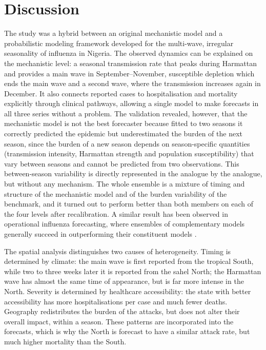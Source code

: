 \documentclass[12pt,a4paper]{article}
\theoremstyle{definition}
\theoremstyle{remark}
\begin{document}
\section{Discussion}\label{sec:discussion}

The study was a hybrid between an original mechanistic model and a probabilistic modeling framework developed for the multi-wave, irregular seasonality of influenza in Nigeria. The observed dynamics can be explained on the mechanistic level: a seasonal transmission rate that peaks during Harmattan and provides a main wave in September–November, susceptible depletion which ends the main wave and a second wave, where the transmission increases again in December. It also connects reported cases to hospitalisation and mortality explicitly through clinical pathways, allowing a single model to make forecasts in all three series without a problem. The validation revealed, however, that the mechanistic model is not the best forecaster because fitted to two seasons it correctly predicted the epidemic but underestimated the burden of the next season, since the burden of a new season depends on season-specific quantities (transmission intensity, Harmattan strength and population susceptibility) that vary between seasons and cannot be predicted from two observations. This between-season variability is directly represented in the analogue by the analogue, but without any mechanism. The whole ensemble is a mixture of timing and structure of the mechanistic model and of the burden variability of the benchmark, and it turned out to perform better than both members on each of the four levels after recalibration. A similar result has been observed in operational influenza forecasting, where ensembles of complementary models generally succeed in outperforming their constituent models \cite{Mathis2024FluSight,Tsang2024adaptive,Ray2025Flusion}.

The spatial analysis distinguishes two causes of heterogeneity. Timing is determined by climate: the main wave is first reported from the tropical South, while two to three weeks later it is reported from the sahel North; the Harmattan wave has almost the same time of appearance, but is far more intense in the North. Severity is determined by healthcare accessibility: the state with better accessibility has more hospitalisations per case and much fewer deaths. Geography redistributes the burden of the attacks, but does not alter their overall impact, within a season. These patterns are incorporated into the forecasts, which is why the North is forecast to have a similar attack rate, but much higher mortality than the South.
\end{document}
